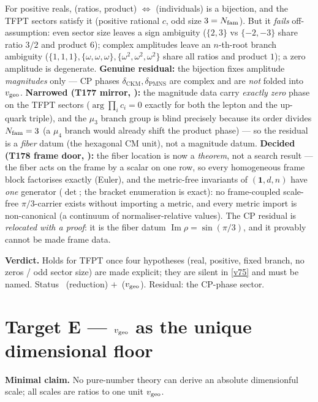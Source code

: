 \begin{keybox}
For positive reals, (ratios, product) $\Leftrightarrow$ (individuals) is a bijection, and the TFPT
sectors satisfy it (positive rational $c$, odd size $3=N_{\mathrm{fam}}$). But it \emph{fails} off-assumption:
even sector size leaves a sign ambiguity ($\{2,3\}$ vs $\{-2,-3\}$ share ratio $3/2$ and product
$6$); complex amplitudes leave an $n$-th-root branch ambiguity ($\{1,1,1\},\{\omega,\omega,\omega\},
\{\omega^2,\omega^2,\omega^2\}$ share all ratios and product $1$); a zero amplitude is degenerate.
\textbf{Genuine residual:} the bijection fixes amplitude \emph{magnitudes} only --- CP phases
$\delta_{\mathrm{CKM}},\delta_{\mathrm{PMNS}}$ are complex and are \emph{not} folded into $v_{\mathrm{geo}}$.
\textbf{Narrowed (T177 mirror, ):} the magnitude data carry
\emph{exactly zero} phase on the TFPT sectors ($\arg\prod_ic_i=0$ exactly for both the lepton and
the up-quark triple), and the $\mu_3$ branch group is blind precisely because its order divides
$N_{\mathrm{fam}}=3$ (a $\mu_4$ branch would already shift the product phase) --- so the residual is a
\emph{fiber} datum (the hexagonal CM unit), not a magnitude datum.
\textbf{Decided (T178 frame door, ):} the fiber location is now a
\emph{theorem}, not a search result --- the fiber acts on the frame by a scalar on one row, so every
homogeneous frame block factorises exactly (Euler), and the metric-free invariants of $(\mathbf1,d,n)$
have \emph{one} generator ($\det$; the bracket enumeration is exact): no frame-coupled scale-free
$\pi/3$-carrier exists without importing a metric, and every metric import is non-canonical (a
continuum of normaliser-relative values). The CP residual is \emph{relocated with a proof}: it is the
fiber datum $\operatorname{Im}\rho=\sin(\pi/3)$, and it provably cannot be made frame data.
\end{keybox}

\noindent\textbf{Verdict.} Holds for TFPT once four hypotheses (real, positive, fixed branch, no
zeros / odd sector size) are made explicit; they are silent in \vref{v75} and must be named. Status \mE\,
(reduction) $+$ \mO\,($v_{\mathrm{geo}}$). Residual: the CP-phase sector.

\section*{Target E --- $v_{\mathrm{geo}}$ as the unique dimensional floor}\label{sec:E}
\noindent\textbf{Minimal claim.} No pure-number theory can derive an absolute dimensionful scale; all
scales are ratios to one unit $v_{\mathrm{geo}}$.

